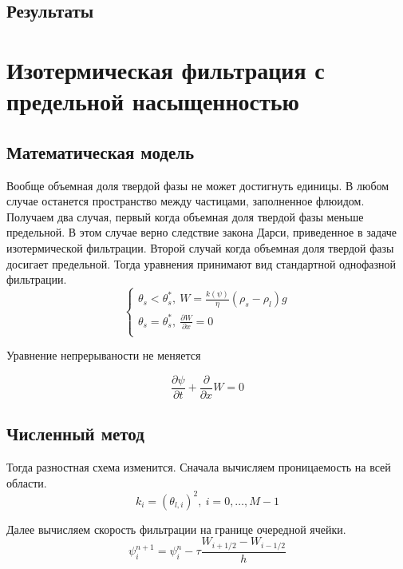 \documentclass[12pt,a4paper]{article}
\newcommand{\pd}[2]{\frac{\partial #1}{\partial #2}}
\begin{document}
\subsection{Результаты}

\newpage
\section{Изотермическая фильтрация с предельной насыщенностью}
\subsection{Математическая модель}
Вообще объемная доля твердой фазы не может достигнуть единицы. В любом случае останется пространство между частицами, заполненное флюидом. Получаем два случая, первый когда объемная доля твердой фазы меньше предельной. В этом случае верно следствие закона Дарси, приведенное в задаче изотермической фильтрации. Второй случай когда объемная доля твердой фазы досигает предельной. Тогда уравнения принимают вид стандартной однофазной фильтрации. 
\begin{equation}
\begin{cases}
\theta_s < \theta_s^*,\  W = \frac{k(\psi)}{\eta} (\rho_s - \rho_l) g\\
\theta_s = \theta_s^*,\  \pd{W}{x} = 0\\
\end{cases}
\end{equation}

Уравнение непрерываности не меняется

$$
\pd{\psi}{t} + \pd{}{x}W = 0
$$

\subsection{Численный метод}
Тогда разностная схема изменится. 
Сначала вычисляем проницаемость на всей области.
\begin{equation}
k_i = (\theta_{l,i})^2 , \ i = 0,  \dots ,M-1
\label{perm_razn2}
\end{equation}

Далее вычисляем скорость фильтрации на границе очередной ячейки.
\begin{equation}
\psi_i^{n+1} = \psi_i^n - \tau\frac{W_{i+1/2} - W_{i-1/2}}{h}
\label{filtr_razn2}
\end{equation}
\end{document}

